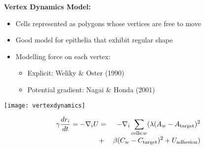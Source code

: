 \documentclass[a0paper,landscape,final]{baposter}
\newcommand{\compresslist}{
	\setlength{\itemsep}{1pt}
	\setlength{\parskip}{0pt}
	\setlength{\parsep}{0pt}
}
\begin{document}
\begin{poster}
{	\vspace{0.3cm}
	
	\textbf{Vertex Dynamics Model:}\\
	\begin{minipage}{0.7\linewidth}
		\vspace{0.3cm}
		\begin{itemize}[leftmargin=0.5cm]\compresslist
		\item[\colouredcircle] Cells represented as polygons whose vertices are free to move
		\item[\colouredcircle] Good model for epithelia that exhibit regular shape
		\item[\colouredcircle] Modelling force on each vertex:
			\smaller
			\begin{itemize}[leftmargin=0.3cm]\compresslist
			\item Explicit: Weliky \& Oster (1990)
			\item Potential gradient: Nagai \& Honda (2001)
			\end{itemize}
		\end{itemize}
	\end{minipage}
	\begin{minipage}{0.2\linewidth}
		\texttt{[image: vertexdynamics]}  
	\end{minipage}  
	\vspace{-0.2cm}
	\begin{eqnarray*}
	\smaller
	\gamma\dfrac{dr_{i}}{dt} = - \nabla_{i} U &=& -\nabla_{i}\sum_{\text{cells:}w}(\lambda(A_{w} - A_{\text{target}})^2 \\[-0.08cm]
	&+& \beta(C_{w} - C_{\text{target}})^2 + U_{\text{adhesion}})
	\end{eqnarray*}
}
  
  
\end{poster}
\end{document}
